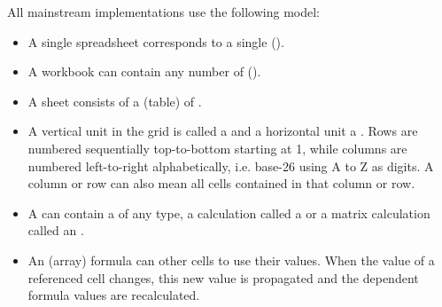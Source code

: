 All mainstream implementations use the following model:
\begin{itemize}
\item A single spreadsheet  corresponds to a single ().
\item A workbook can contain any number of ().
\item A sheet consists of a  (table) of .
\item A vertical unit in the grid is called a  and a horizontal unit a .
Rows are numbered sequentially top-to-bottom starting at 1, while columns are numbered left-to-right alphabetically, i.e. base-26 using A to Z as digits.
A column or row can also mean all cells contained in that column or row.
\item A  can contain a  of any type, a calculation called a  or a matrix calculation called an .
\item An (array) formula can  other cells to use their values. When the value of a referenced cell changes, this new value is propagated and the dependent formula values are recalculated.
\end{itemize}

